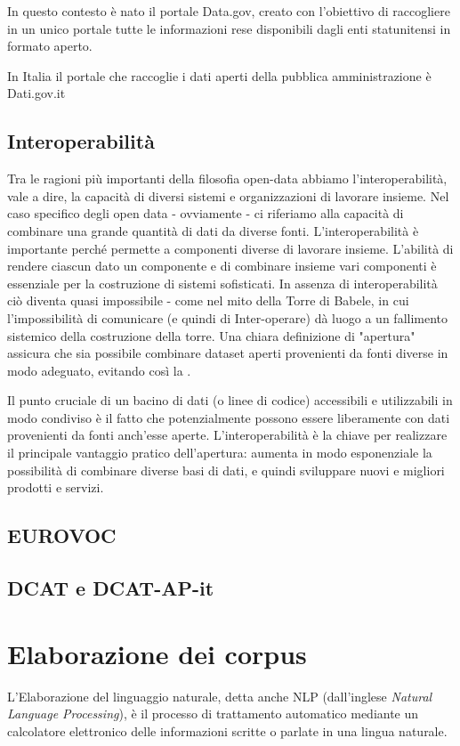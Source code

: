 \documentclass{article}
\theoremstyle{plain}
\theoremstyle{definition}
\begin{document}
In questo contesto è nato il portale Data.gov, creato con l'obiettivo di raccogliere in un unico portale tutte le informazioni rese disponibili dagli enti statunitensi in formato aperto.

In Italia il portale che raccoglie i dati aperti della pubblica amministrazione è Dati.gov.it
 
\subsection{Interoperabilità}
Tra le ragioni più importanti della filosofia open-data abbiamo l'interoperabilità, vale a dire, la capacità di diversi sistemi e organizzazioni di lavorare insieme. Nel caso specifico degli open data - ovviamente - ci riferiamo alla capacità di combinare una grande quantità di dati da diverse fonti. L'interoperabilità è importante perché permette a componenti diverse di lavorare insieme. L'abilità di rendere ciascun dato un componente e di combinare insieme vari componenti è essenziale per la costruzione di sistemi sofisticati. In assenza di interoperabilità ciò diventa quasi impossibile - come nel mito della Torre di Babele, in cui l'impossibilità di comunicare (e quindi di Inter-operare) dà luogo a un fallimento sistemico della costruzione della torre. Una chiara definizione di "apertura" assicura che sia possibile combinare dataset aperti provenienti da fonti diverse in modo adeguato, evitando così la .

Il punto cruciale di un bacino di dati (o linee di codice) accessibili e utilizzabili in modo condiviso è il fatto che potenzialmente possono essere liberamente  con dati provenienti da fonti anch'esse aperte. L'interoperabilità è la chiave per realizzare il principale vantaggio pratico dell'apertura: aumenta in modo esponenziale la possibilità di combinare diverse basi di dati, e quindi sviluppare nuovi e migliori prodotti e servizi.
\footnotemark
{}

\subsection{EUROVOC}
\subsection{DCAT e DCAT-AP-it}


\newpage
\section{Elaborazione dei corpus}
L'Elaborazione del linguaggio naturale, detta anche NLP (dall'inglese \textit{Natural Language Processing}), è il processo di trattamento automatico mediante un calcolatore elettronico delle informazioni scritte o parlate in una lingua naturale.
\end{document}
